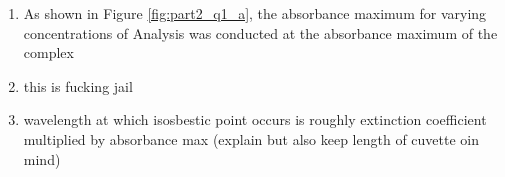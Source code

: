 \begin{enumerate}
    \item As shown in Figure \ref{fig:part2_q1_a}, the absorbance maximum for varying  concentrations of 
    Analysis was conducted at the absorbance maximum of the  complex
    \item this is fucking jail
    \item wavelength at which isosbestic point occurs is roughly extinction coefficient multiplied by absorbance max (explain but also keep length of cuvette oin mind)
\end{enumerate}



